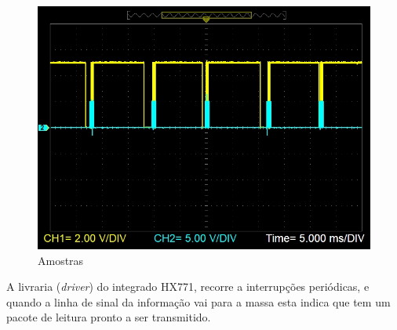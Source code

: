 \begin{figure}[H]
	\centering
	\includegraphics[scale=0.55]{./image/PESTA/graph/80SPS64GAIN/SPS_80.JPG}
	\caption{Amostras}
	\label{SPS_64}
\end{figure}
A livraria (\textit{driver}) do integrado HX771, recorre a interrupções periódicas, e quando a linha de sinal da informação vai para a massa esta  indica que tem um pacote de leitura pronto a ser transmitido.
\\
\\
